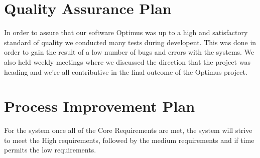 
\section{Quality Assurance Plan}

In order to assure that our software Optimus was up to a high and satisfactory standard of quality we conducted many tests during developent. This was done in order to gain the result of a low number of bugs and errors with the systems. We also held weekly meetings where we discussed the direction that the project was heading and we're all contributive in the final outcome of the Optimus project.


\section{Process Improvement Plan}

For the system once all of the Core Requirements are met, the system will strive to meet the High requirements, followed by the medium requirements and if time permits the low requirements.


